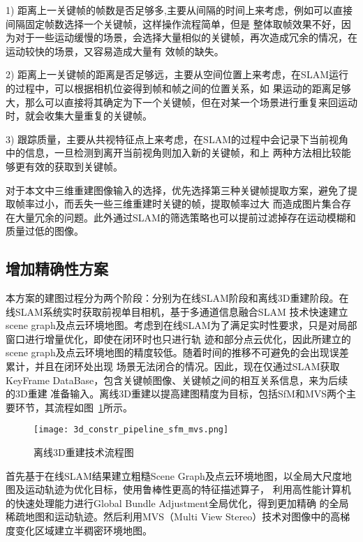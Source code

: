 1)	距离上一关键帧的帧数是否足够多,主要从间隔的时间上来考虑，例如可以直接间隔固定帧数选择一个关键帧，这样操作流程简单，但是
整体取帧效果不好，因为对于一些运动缓慢的场景，会选择大量相似的关键帧，再次造成冗余的情况，在运动较快的场景，又容易造成大量有
效帧的缺失。

2)	距离上一关键帧的距离是否足够远，主要从空间位置上来考虑，在SLAM运行的过程中，可以根据相机位姿得到帧和帧之间的位置关系，如
果运动的距离足够大，那么可以直接将其确定为下一个关键帧，但在对某一个场景进行重复来回运动时，就会收集大量重复的关键帧。

3)	跟踪质量，主要从共视特征点上来考虑，在SLAM的过程中会记录下当前视角中的信息，一旦检测到离开当前视角则加入新的关键帧，和上
两种方法相比较能够更有效的获取到关键帧。

对于本文中三维重建图像输入的选择，优先选择第三种关键帧提取方案，避免了提取帧率过小，而丢失一些三维重建时关键的帧，提取帧率过大
而造成图片集合存在大量冗余的问题。此外通过SLAM的筛选策略也可以提前过滤掉存在运动模糊和质量过低的图像。
\subsection{增加精确性方案}
\label{sec:3.3.2}
本方案的建图过程分为两个阶段：分别为在线SLAM阶段和离线3D重建阶段。在线SLAM系统实时获取前视单目相机，基于多通道信息融合SLAM
技术快速建立scene graph及点云环境地图。考虑到在线SLAM为了满足实时性要求，只是对局部窗口进行增量优化，即使在闭环时也只进行轨
迹和部分点云优化，因此所建立的scene graph及点云环境地图的精度较低。随着时间的推移不可避免的会出现误差累计，并且在闭环处出现
场景无法闭合的情况。因此，现在仅通过SLAM获取KeyFrame DataBase，包含关键帧图像、关键帧之间的相互关系信息，来为后续的3D重建
准备输入。离线3D重建以提高建图精度为目标，包括SfM和MVS两个主要环节，其流程如图~\ref{fig:3d_constr_pipeline_sfm_mvs}所示。
\begin{figure}[H] %
  \centering
  \texttt{[image: 3d\_constr\_pipeline\_sfm\_mvs.png]}
  \caption{离线3D重建技术流程图}
  \label{fig:3d_constr_pipeline_sfm_mvs}
\end{figure}
首先基于在线SLAM结果建立粗糙Scene Graph及点云环境地图，以全局大尺度地图及运动轨迹为优化目标，使用鲁棒性更高的特征描述算子，
利用高性能计算机的快速处理能力进行Global Bundle Adjustment全局优化，得到更加精确
的全局稀疏地图和运动轨迹。然后利用MVS（Multi View Stereo）技术对图像中的高梯度变化区域建立半稠密环境地图。